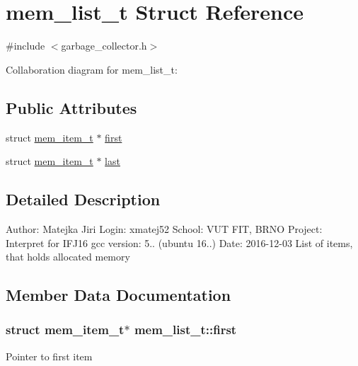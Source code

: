 \hypertarget{structmem__list__t}{}\section{mem\+\_\+list\+\_\+t Struct Reference}
\label{structmem__list__t}


{\ttfamily \#include $<$garbage\+\_\+collector.\+h$>$}



Collaboration diagram for mem\+\_\+list\+\_\+t\+:
\subsection*{Public Attributes}
\begin{DoxyCompactItemize}
\item 
struct \hyperlink{structmem__item__t}{mem\+\_\+item\+\_\+t} $\ast$ \hyperlink{structmem__list__t_a660f5ef09ad8cd1d5dcd84a12600b8de}{first}
\item 
struct \hyperlink{structmem__item__t}{mem\+\_\+item\+\_\+t} $\ast$ \hyperlink{structmem__list__t_ad0d6a4567a65701564f45cb8161f675a}{last}
\end{DoxyCompactItemize}


\subsection{Detailed Description}
Author\+: Matejka Jiri Login\+: xmatej52 School\+: V\+UT F\+IT, B\+R\+NO Project\+: Interpret for I\+F\+J16 gcc version\+: 5.. (ubuntu 16..) Date\+: 2016-\/12-\/03 List of items, that holds allocated memory 

\subsection{Member Data Documentation}
\subsubsection[{\texorpdfstring{first}{first}}]{\setlength{\rightskip}{0pt plus 5cm}struct {\bf mem\+\_\+item\+\_\+t}$\ast$ mem\+\_\+list\+\_\+t\+::first}\hypertarget{structmem__list__t_a660f5ef09ad8cd1d5dcd84a12600b8de}{}\label{structmem__list__t_a660f5ef09ad8cd1d5dcd84a12600b8de}
Pointer to first item 
